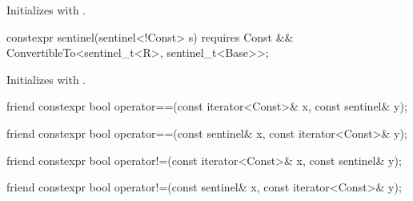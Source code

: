 {\begin{itemdescr}
\pnum
\effects Initializes  with .
\end{itemdescr}

\begin{itemdecl}
constexpr sentinel(sentinel<!Const> s) requires Const &&
  ConvertibleTo<sentinel_t<R>, sentinel_t<Base>>;
\end{itemdecl}

\begin{itemdescr}
\pnum
\effects Initializes  with .
\end{itemdescr}

\begin{itemdecl}
friend constexpr bool operator==(const iterator<Const>& x, const sentinel& y);
\end{itemdecl}

\begin{itemdescr}
\pnum
\oldtxt{\returns} 
\end{itemdescr}

\begin{itemdecl}
friend constexpr bool operator==(const sentinel& x, const iterator<Const>& y);
\end{itemdecl}

\begin{itemdescr}
\pnum
\oldtxt{\returns} 
\end{itemdescr}

\begin{itemdecl}
friend constexpr bool operator!=(const iterator<Const>& x, const sentinel& y);
\end{itemdecl}

\begin{itemdescr}
\pnum
\oldtxt{\returns} 
\end{itemdescr}

\begin{itemdecl}
friend constexpr bool operator!=(const sentinel& x, const iterator<Const>& y);
\end{itemdecl}

}
